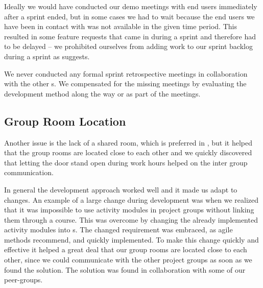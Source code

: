 Ideally we would have conducted our demo meetings with end users immediately after a sprint ended, but in some cases we had to wait because the end users we have been in contact with was not available in the given time period.
This resulted in some feature requests that came in during a sprint and therefore had to be delayed -- we prohibited ourselves from adding work to our sprint backlog during a sprint as \scrum{} suggests.

We never conducted any formal sprint retrospective meetings in collaboration with the other \subgroup{}s.
We compensated for the missing meetings by evaluating the development method along the way or as part of the \sos{} meetings. 





\subsection{Group Room Location}
Another issue is the lack of a shared room, which is preferred in \sos{}, but it helped that the group rooms are located close to each other and we quickly discovered that letting the door stand open during work hours helped on the inter group communication. 

In general the development approach worked well and it made us adapt to changes. 
An example of a large change during development was when we realized that it was impossible to use activity modules in project groups without linking them through a course.
This was overcome by changing the already implemented activity modules into \block[]s. 
The changed requirement was embraced, as agile methods recommend, and quickly implemented.
To make this change quickly and effective it helped a great deal that our group rooms are located close to each other, since we could communicate with the other project groups as soon as we found the solution.
The solution was found in collaboration with some of our peer-groups.






